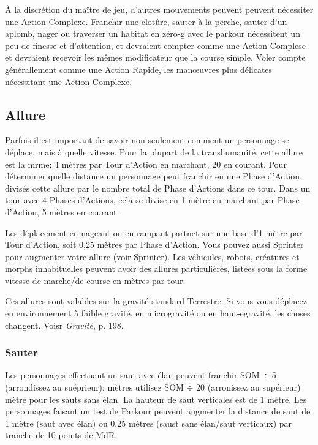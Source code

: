 À la discrétion du maître de jeu, d'autres mouvements peuvent peuvent nécessiter une Action Complexe. Franchir une clotûre, sauter à la perche, sauter d'un aplomb, nager ou traverser un habitat en zéro-g avec le parkour nécessitent un peu de finesse et d'attention, et devraient compter comme une Action Complese et devraient recevoir les mêmes modificateur que la course simple. Voler compte générallement comme une Action Rapide, les manœuvres plus délicates nécessitant une Action Complexe. 

\subsection{Allure} \label{sec:movement-rates} 

Parfois il est important de savoir non seulement comment un personnage se déplace, mais à quelle vitesse. Pour la plupart de la transhumanité, cette allure est la mrme: 4 mètres par Tour d'Action en marchant, 20 en courant. Pour déterminer quelle distance un personnage peut franchir en une Phase d'Action, divisés cette allure par le nombre total de Phase d'Actions dans ce tour. Dans un tour avec 4 Phases d'Actions, cela se divise en 1 mètre en marchant par Phase d'Action, 5 mètres en courant. 

Les déplacement en nageant ou en rampant partnet sur une base d'1 mètre par Tour d'Action, soit 0,25 mètres par Phase d'Action. Vous pouvez aussi Sprinter pour augmenter votre allure (voir Sprinter). Les véhicules, robots, créatures et morphs inhabituelles peuvent avoir des allures particulières, listées sous la forme vitesse de marche/de course en mètres par tour. 

Ces allures sont valables sur la gravité standard Terrestre. Si vous vous déplacez en environnement à faible gravité, en microgravité ou en haut-egravité, les choses changent. Voisr \emph{ Gravité}, p. 198. 

\subsubsection{Sauter} 

Les personnages effectuant un saut avec élan peuvent franchir SOM $\div$ 5 (arrondissez au suéprieur); mètres utilisez SOM $\div$ 20 (arronissez au supérieur) mètre pour les sauts sans élan. La hauteur de saut verticales est de 1 mètre. Les personnages faisant un test de Parkour peuvent augmenter la distance de saut de 1 mètre (saut avec élan) ou 0,25 mètres (saust sans élan/saut verticaux) par tranche de 10 points de MdR. 

